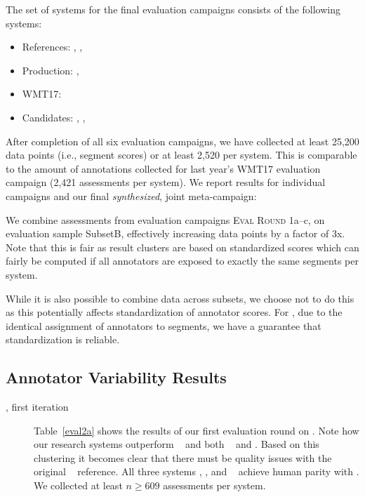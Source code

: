\documentclass[a4paper]{article}
\begin{document}
\begin{CJK*}{UTF8}{gbsn}
The set of systems for the final evaluation campaigns consists of the following systems:
\begin{itemize}[noitemsep]
\item References: \RefHT, \RefPE, \RefWMT
\item Production: \Microsoft, \Google
\item WMT17: \Sogou
\item Candidates: \ComboA, \ComboB, \ComboC
\end{itemize}

After completion of all six evaluation campaigns, we have collected at least 25,200 data points (i.e., segment scores) or at least 2,520 per system. This is comparable to the amount of annotations collected for last year's WMT17 evaluation campaign (2,421 assessments per system). We report results for individual campaigns and our final \emph{synthesized}, joint meta-campaign:

\begin{description}[noitemsep]
\item[\MetaA] We combine assessments from evaluation campaigns \textsc{Eval Round 1}a--c, on evaluation sample SubsetB, effectively increasing data points by a factor of 3x. Note that this is fair as result clusters are based on standardized scores which can fairly be computed if all annotators are exposed to exactly the same segments per system.



\end{description}

While it is also possible to combine data across subsets, we choose not to do this as this potentially affects standardization of annotator scores. For \MetaA, due to the identical assignment of annotators to segments, we have a guarantee that standardization is reliable.





\subsection{Annotator Variability Results}
\begin{description}
\item[\SubsetB, first iteration] Table~\ref{eval2a} shows the results of our first evaluation round on \SubsetB. Note how our research systems outperform \Sogou~ and both \RefWMT~ and \RefPE. Based on this clustering it becomes clear that there must be quality issues with the original \RefWMT~ reference. All three systems \ComboA, \ComboB, and \ComboC~ achieve human parity with \RefHT. We collected at least $n \geq 609$ assessments per system.


\end{description}
\end{CJK*}
\end{document}
